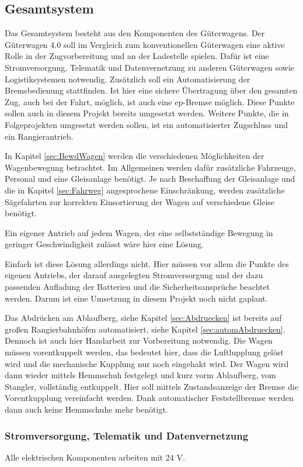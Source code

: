 \subsection{Gesamtsystem}
Das Gesamtsystem besteht aus den Komponenten des Güterwagens. Der Güterwagen 4.0 soll im Vergleich zum konventionellen Güterwagen eine aktive Rolle in der Zugvorbereitung und an der Ladestelle spielen. Dafür ist eine Stromversorgung, Telematik und Datenvernetzung zu anderen Güterwagen sowie Logistiksystemen notwendig. Zusätzlich soll ein Automatisierung der Bremsbedienung stattfinden. Ist hier eine sichere Übertragung über den gesamten Zug, auch bei der Fahrt, möglich, ist auch eine ep-Bremse möglich. Diese Punkte sollen auch in diesem Projekt bereits umgesetzt werden. Weitere Punkte, die in Folgeprojekten umgesetzt werden sollen, ist ein automatisierter Zugschluss und ein Rangierantrieb.\par
In Kapitel \ref{sec:BewdWagen} werden die verschiedenen Möglichkeiten der Wagenbewegung betrachtet. Im Allgemeinen werden dafür zusätzliche Fahrzeuge, Personal und eine Gleisanlage benötigt. Je nach Beschaffung der Gleisanlage und die in Kapitel \ref{sec:Fahrweg} angesprochene Einschränkung, werden zusätzliche Sägefahrten zur korrekten Einsortierung der Wagen auf verschiedene Gleise benötigt. \par
Ein eigener Antrieb auf jedem Wagen, der eine selbstständige Bewegung in geringer Geschwindigkeit zulässt wäre hier eine Lösung.\par
Einfach ist diese Lösung allerdings nicht. Hier müssen vor allem die Punkte des eigenen Antriebs, der darauf ausgelegten Stromversorgung und der dazu passenden Aufladung der Batterien und die Sicherheitsansprüche beachtet werden. Darum ist eine Umsetzung in diesem Projekt noch nicht gaplant.\par
Das Abdrücken am \gls{Ablaufberg}, siehe Kapitel \ref{sec:Abdruecken} ist bereits auf großen Rangierbahnhöfen automatisiert, siehe Kapitel \ref{sec:automAbdruecken}. Dennoch ist auch hier Handarbeit zur Vorbereitung notwendig. Die Wagen müssen vorentkuppelt werden, das bedeutet hier, dass die Luftlupplung gelöst wird und die mechanische Kupplung nur noch eingehakt wird. Der Wagen wird dann wieder mittels Hemmschuh festgelegt und kurz vorm \gls{Ablaufberg}, vom Stangler, vollständig entkuppelt. Hier soll mittels Zustandsanzeige der Bremse die Vorentkupplung vereinfacht werden. Dank automatischer Feststellbremse werden dann auch keine Hemmschuhe mehr benötigt.

\subsubsection{Stromversorgung, Telematik und Datenvernetzung}
Alle elektrischen Komponenten arbeiten mit 24 V. 

